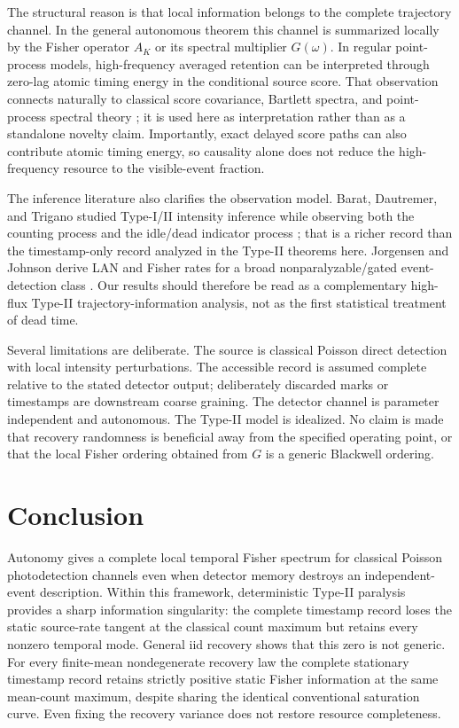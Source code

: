 \documentclass[aps,prapplied,preprint,nofootinbib]{revtex4-2}
\begin{document}
The structural reason is that local information belongs to the complete trajectory channel. In the general autonomous theorem this channel is summarized locally by the Fisher operator $A_K$ or its spectral multiplier $G(\omega)$. In regular point-process models, high-frequency averaged retention can be interpreted through zero-lag atomic timing energy in the conditional source score. That observation connects naturally to classical score covariance, Bartlett spectra, and point-process spectral theory \cite{Clark2026,DaleyVereJones2003}; it is used here as interpretation rather than as a standalone novelty claim. Importantly, exact delayed score paths can also contribute atomic timing energy, so causality alone does not reduce the high-frequency resource to the visible-event fraction.

The inference literature also clarifies the observation model. Barat, Dautremer, and Trigano studied Type-I/II intensity inference while observing both the counting process and the idle/dead indicator process \cite{BaratDautremerTrigano2006}; that is a richer record than the timestamp-only record analyzed in the Type-II theorems here. Jorgensen and Johnson derive LAN and Fisher rates for a broad nonparalyzable/gated event-detection class \cite{JorgensenJohnson2026}. Our results should therefore be read as a complementary high-flux Type-II trajectory-information analysis, not as the first statistical treatment of dead time.

Several limitations are deliberate. The source is classical Poisson direct detection with local intensity perturbations. The accessible record is assumed complete relative to the stated detector output; deliberately discarded marks or timestamps are downstream coarse graining. The detector channel is parameter independent and autonomous. The Type-II model is idealized. No claim is made that recovery randomness is beneficial away from the specified operating point, or that the local Fisher ordering obtained from $G$ is a generic Blackwell ordering.

\section{Conclusion}

Autonomy gives a complete local temporal Fisher spectrum for classical Poisson photodetection channels even when detector memory destroys an independent-event description. Within this framework, deterministic Type-II paralysis provides a sharp information singularity: the complete timestamp record loses the static source-rate tangent at the classical count maximum but retains every nonzero temporal mode. General iid recovery shows that this zero is not generic. For every finite-mean nondegenerate recovery law the complete stationary timestamp record retains strictly positive static Fisher information at the same mean-count maximum, despite sharing the identical conventional saturation curve. Even fixing the recovery variance does not restore resource completeness.
\end{document}
